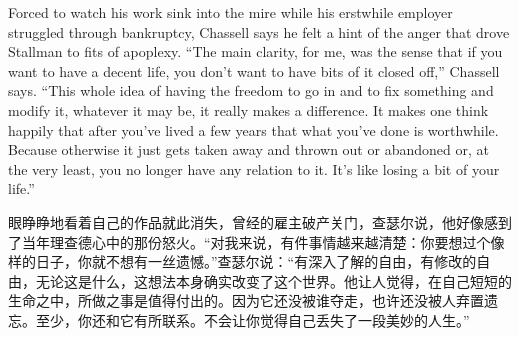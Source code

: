 \ifdefined\eng
Forced to watch his work sink into the mire while his erstwhile employer struggled through bankruptcy, Chassell says he felt a hint of the anger that drove Stallman to fits of apoplexy. ``The main clarity, for me, was the sense that if you want to have a decent life, you don't want to have bits of it closed off,'' Chassell says. ``This whole idea of having the freedom to go in and to fix something and modify it, whatever it may be, it really makes a difference. It makes one think happily that after you've lived a few years that what you've done is worthwhile. Because otherwise it just gets taken away and thrown out or abandoned or, at the very least, you no longer have any relation to it. It's like losing a bit of your life.''
\fi

\ifdefined\chs
眼睁睁地看着自己的作品就此消失，曾经的雇主破产关门，查瑟尔说，他好像感到了当年理查德心中的那份怒火。“对我来说，有件事情越来越清楚：你要想过个像样的日子，你就不想有一丝遗憾。”查瑟尔说：“有深入了解的自由，有修改的自由，无论这是什么，这想法本身确实改变了这个世界。他让人觉得，在自己短短的生命之中，所做之事是值得付出的。因为它还没被谁夺走，也许还没被人弃置遗忘。至少，你还和它有所联系。不会让你觉得自己丢失了一段美妙的人生。”
\fi

\bigskip

\theendnotes
\setcounter{endnote}{0}
